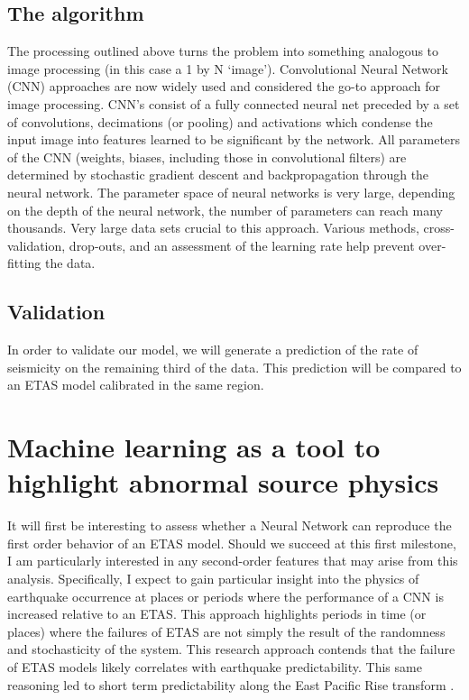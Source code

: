 \documentclass[12pt, notitlepage]{report}
\begin{document}
\subsection{The algorithm}

The processing outlined above turns the problem into something analogous to image processing (in this case a 1 by N `image'). Convolutional Neural Network (CNN) approaches are now widely used and considered the go-to approach for image processing. CNN's consist of a fully connected neural net preceded by a set of convolutions, decimations (or pooling) and activations which condense the input image into features learned to be significant by the network. All parameters of the CNN (weights, biases, including those in convolutional filters) are determined by stochastic gradient descent and backpropagation through the neural network. The parameter space of neural networks is very large, depending on the depth of the neural network, the number of parameters can reach many thousands. Very large data sets crucial to this approach. Various methods, cross-validation, drop-outs, and an assessment of the learning rate help prevent over-fitting the data.

\subsection{Validation}
In order to validate our model, we will generate a prediction of the rate of seismicity on the remaining third of the data. This prediction will be compared to an ETAS model calibrated in the same region.

\section{Machine learning as a tool to highlight abnormal source physics}
It will first be interesting to assess whether a Neural Network can reproduce the first order behavior of an ETAS model. Should we succeed at this first milestone, I am particularly interested in any second-order features that may arise from this analysis. Specifically, I expect to gain particular insight into the physics of earthquake occurrence at places or periods where the performance of a CNN is increased relative to an ETAS. This approach highlights periods in time (or places) where the failures of ETAS are not simply the result of the randomness and stochasticity of the system. This research approach contends that the failure of ETAS models likely correlates with earthquake predictability. This same reasoning led to short term predictability along the East Pacific Rise transform \cite{McGuireForeshockFaults}. 
\end{document}
